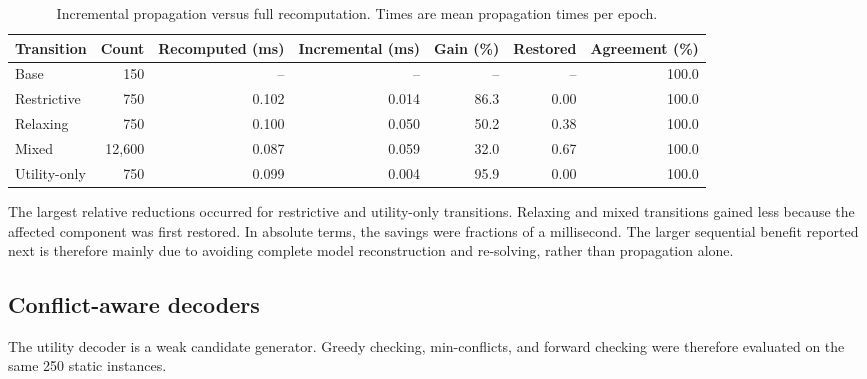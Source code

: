 \documentclass[pdflatex,sn-mathphys-num,iicol,oneside]{sn-jnl}
\begin{document}
\begin{table}[t]
\centering
\caption{
Incremental propagation versus full recomputation. Times are mean
propagation times per epoch.
}
\label{tab:incremental-results}
\setlength{\tabcolsep}{4pt}
\small

\begin{tabular}{lrrrrrr}
\toprule
Transition &
Count &
Recomputed (ms) &
Incremental (ms) &
Gain (\%) &
Restored &
Agreement (\%)\\
\midrule

Base
& 150 & -- & -- & -- & -- & 100.0\\

Restrictive
& 750 & 0.102 & 0.014 & 86.3 & 0.00 & 100.0\\

Relaxing
& 750 & 0.100 & 0.050 & 50.2 & 0.38 & 100.0\\

Mixed
& 12{,}600 & 0.087 & 0.059 & 32.0 & 0.67 & 100.0\\

Utility-only
& 750 & 0.099 & 0.004 & 95.9 & 0.00 & 100.0\\

\bottomrule
\end{tabular}
\normalsize
\end{table}

The largest relative reductions occurred for restrictive and
utility-only transitions. Relaxing and mixed transitions gained less
because the affected component was first restored. In absolute terms,
the savings were fractions of a millisecond. The larger sequential
benefit reported next is therefore mainly due to avoiding complete
model reconstruction and re-solving, rather than propagation alone.

\subsection{Conflict-aware decoders}
\label{sec:decoder-baselines}

The utility decoder is a weak candidate generator. Greedy checking,
min-conflicts, and forward checking were therefore evaluated on the
same 250 static instances.
\end{document}

